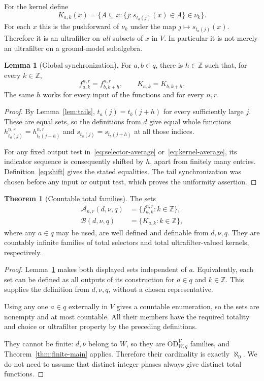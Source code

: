 \documentclass[11pt,letterpaper]{article}
\theoremstyle{definition}
\newtheorem{theorem}[definition]{Theorem}
\newtheorem{lemma}[definition]{Lemma}
\numberwithin{equation}{section}
\newcommand{\OD}{\mathrm{OD}}
\newcommand{\ODW}{\OD^{V}_{W,q}}
\begin{document}
For the kernel define
\begin{equation}\label{eq:kernel-average}
K_{a,k}(x)=
\{A\subseteq x:\{j:s_{t_a(j)}(x)\in A\}\in\nu_k\}.
\end{equation}
For each $x$ this is the pushforward of $\nu_k$ under the map $j\mapsto s_{t_a(j)}(x)$. Therefore it is an ultrafilter on \emph{all} subsets of $x$ in $V$. In particular it is not merely an ultrafilter on a ground-model subalgebra.

\begin{lemma}[Global synchronization]\label{lem:global-sync}
For $a,b\in q$, there is $h\in\mathbb Z$ such that, for every $k\in\mathbb Z$,
\[
f_{a,k}^{n,r}=f_{b,k+h}^{n,r},\qquad K_{a,k}=K_{b,k+h}.
\]
The same $h$ works for every input of the functions and for every $n,r$.
\end{lemma}
\begin{proof}
By Lemma~\ref{lem:tails}, $t_a(j)=t_b(j+h)$ for every sufficiently large $j$. These are equal sets, so the definitions from $d$ give equal whole functions $h_{t_a(j)}^{n,r}=h_{t_b(j+h)}^{n,r}$ and $s_{t_a(j)}=s_{t_b(j+h)}$ at all those indices.

For any fixed output test in~\eqref{eq:selector-average} or~\eqref{eq:kernel-average}, its indicator sequence is consequently shifted by $h$, apart from finitely many entries. Definition~\eqref{eq:shift} gives the stated equalities. The tail synchronization was chosen before any input or output test, which proves the uniformity assertion.
\end{proof}

\begin{theorem}[Countable total families]\label{thm:countable}
The sets
\begin{align}
\mathcal A_{n,r}(d,\nu,q)&=\{f_{a,k}^{n,r}:k\in\mathbb Z\},\label{eq:Afamily}\\
\mathcal B(d,\nu,q)&=\{K_{a,k}:k\in\mathbb Z\},\label{eq:Bfamily}
\end{align}
where any $a\in q$ may be used, are well defined and definable from $d,\nu,q$. They are countably infinite families of total selectors and total ultrafilter-valued kernels, respectively.
\end{theorem}
\begin{proof}
Lemma~\ref{lem:global-sync} makes both displayed sets independent of $a$. Equivalently, each set can be defined as all outputs of its construction for $a\in q$ and $k\in\mathbb Z$. This supplies the definition from $d,\nu,q$, without a chosen representative.

Using any one $a\in q$ externally in $V$ gives a countable enumeration, so the sets are nonempty and at most countable. All their members have the required totality and choice or ultrafilter property by the preceding definitions.

They cannot be finite: $d,\nu$ belong to $W$, so they are $\ODW$ families, and Theorem~\ref{thm:finite-main} applies. Therefore their cardinality is exactly $\aleph_0$. We do not need to assume that distinct integer phases always give distinct total functions.
\end{proof}
\end{document}
